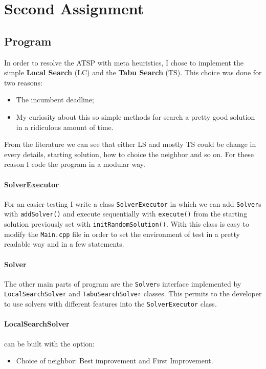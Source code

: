 \section{Second Assignment}

\subsection{Program}
	In order to resolve the ATSP with meta heuristics, I chose to implement the simple \textbf{Local Search} (LC) and the \textbf{Tabu Search} (TS). This choice was done for two reasons: 
	\begin{itemize}
		\item The incumbent deadline;
		\item My curiosity about this so simple methods for search a pretty good solution in a ridiculous amount of time.
	\end{itemize}

	From the literature we can see that either LS and mostly TS could be change in every details, starting solution, how to choice the neighbor and so on. For these reason I code the program in a modular way.
	
	\paragraph{SolverExecutor} For an easier testing I write a class \verb|SolverExecutor| in which we can add \verb|Solver|s with \verb|addSolver()| and execute sequentially with \verb|execute()| from the starting solution previously set with \verb|initRandomSolution()|. With this class is easy to modify the \verb|Main.cpp| file in order to set the environment of test in a pretty readable way and in a few statements.
	
	\paragraph{Solver} The other main parts of program are the \verb|Solver|s interface implemented by \verb|LocalSearchSolver| and \verb|TabuSearchSolver| classes. This permits to the developer to use solvers with different features into the \verb|SolverExecutor| class.
	
	\paragraph{LocalSearchSolver} can be built with the option:
	\begin{itemize}
		\item Choice of neighbor: Best improvement and First Improvement.
	\end{itemize}
	
